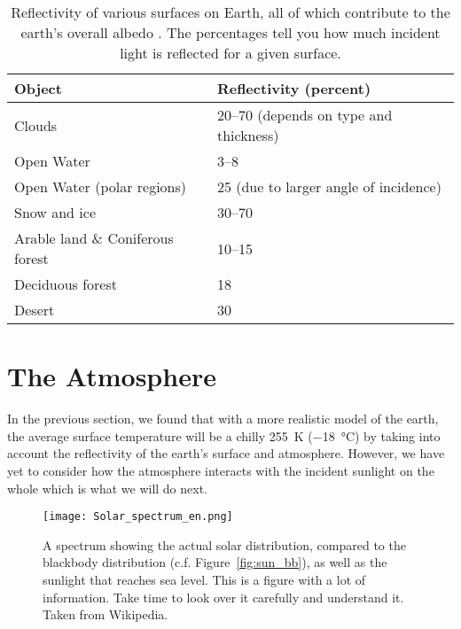     \begin{table}[ht]
    \centering
    \begin{tabular}{|p{5cm}|p{6cm}|}
        \hline
        \textbf{Object}     & \textbf{Reflectivity (percent)}\\
        \hline
        Clouds & 20--70 (depends on type and thickness) \\
        Open Water  & 3--8 \\
        Open Water (polar regions) & 25 (due to larger angle of incidence) \\
        Snow and ice   & 30--70 \\
        Arable land \& Coniferous forest & 10--15 \\
        Deciduous forest  & 18   \\
        Desert & 30  \\
        \hline
    \end{tabular}
    \caption{Reflectivity of various surfaces on Earth, all of which contribute to the earth's overall albedo \citep{thorndike1976energy}. The percentages tell you how much incident light is reflected for a given surface.}  
    \label{tab:albedo}     
    \end{table}


    
   \section{The Atmosphere} %
   \label{sec:the_atmosphere}
    
    In the previous section, we found that with a more realistic model of the earth, the average surface temperature will be a chilly \SI{255}{\kelvin} (\SI{-18}{\celsius}) by taking into account the reflectivity of the earth's surface and atmosphere. However, we have yet to consider how the atmosphere interacts with the incident sunlight on the whole which is what we will do next.

    \begin{figure}[ht]
        \centering 
        \texttt{[image: Solar\_spectrum\_en.png]}
        \caption{A spectrum showing the actual solar distribution, compared to the blackbody distribution (c.f. Figure~\ref{fig:sun_bb}), as well as the sunlight that reaches sea level. This is a figure with a lot of information. Take time to look over it carefully and understand it. Taken from Wikipedia.}
        \label{fig:solar_spec}
    \end{figure}


